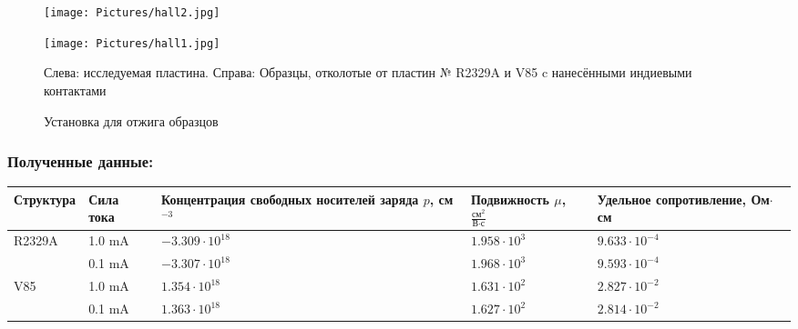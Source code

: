 \documentclass[../FinalReport.tex]{subfiles}
\begin{document}
\begin{figure}[h]
\begin{center}
\begin{minipage}[h]{0.49\linewidth}
\texttt{[image: Pictures/hall2.jpg]}
\end{minipage}
\hfill
\begin{minipage}[h]{0.49\linewidth}
\texttt{[image: Pictures/hall1.jpg]}
\end{minipage}
\caption{Слева: исследуемая пластина. Справа: Образцы, отколотые от пластин № R2329A и V85 c нанесёнными индиевыми контактами}
\end{center}
\end{figure}

\begin{figure}[h!]
\caption{Установка для отжига образцов}
\end{figure}

\subsubsection{Полученные данные:}
\begin{tabular}{| p{} | p{} | p{} | p{} | p{} |}
\hline
\vspace{0 pt} Структура&\vspace{0 pt} Сила тока&\vspace{0 pt} Концентрация свободных носителей заряда $p$, см$^{-3}$& \vspace{0 pt} Подвижность $\mu$, $\frac{\mbox{см}^{2}}{\mbox{В}\cdot\mbox{с}}$& \vspace{0 pt} Удельное сопротивление, Ом$\cdot$см\\
\hline
R2329A&1.0 mA&$-3.309\cdot10^{18}$&$1.958\cdot10^3$&$9.633\cdot10^{-4}$\\
\cline{2-5}
&0.1 mA&$-3.307\cdot10^{18}$&$1.968\cdot10^3$&$9.593\cdot10^{-4}$\\
\hline
V85&1.0 mA&$1.354\cdot10^{18}$&$1.631\cdot10^2$&$2.827\cdot10^{-2}$\\
\cline{2-5}
&0.1 mA&$1.363\cdot10^{18}$&$1.627\cdot10^2$&$2.814\cdot10^{-2}$\\
\hline
\end{tabular}
\end{document}
